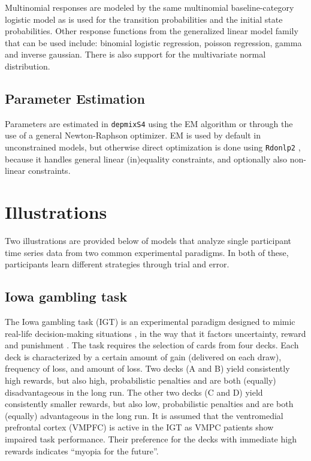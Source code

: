 \documentclass[a4paper,12pt,man,english]{apa} %
\newcommand{\pkg}{\texttt}
\begin{document}
Multinomial responses are modeled by the same multinomial 
baseline-category logistic model as is used for the transition 
probabilities and the initial state probabilities. Other response 
functions from the generalized linear model family that can be used 
include: binomial logistic regression, poisson regression, gamma and 
inverse gaussian. There is also support for the multivariate normal 
distribution. 



\subsection{Parameter Estimation}

Parameters are estimated in \pkg{depmixS4} using the EM algorithm or
through the use of a general Newton-Raphson optimizer.  EM is used by
default in unconstrained models, but otherwise direct optimization is
done using \pkg{Rdonlp2} \cite{Tamura2007,Spellucci2002}, because it
handles general linear (in)equality constraints, and optionally also
non-linear constraints.


\section{Illustrations}


Two illustrations are provided below of models that analyze single
participant time series data from two common experimental paradigms.
In both of these, participants learn different strategies through
trial and error.


\subsection{Iowa gambling task}

The Iowa gambling task (IGT) is an experimental paradigm designed to
mimic real-life decision-making situations \cite{Bechara1994}, in the
way that it factors uncertainty, reward and punishment
\cite{Dunn2006}.  The task requires the selection of cards from four
decks.  Each deck is characterized by a certain amount of gain
(delivered on each draw), frequency of loss, and amount of loss.  Two
decks (A and B) yield consistently high rewards, but also high,
probabilistic penalties and are both (equally) disadvantageous in the
long run.  The other two decks (C and D) yield consistently smaller
rewards, but also low, probabilistic penalties and are both (equally)
advantageous in the long run.  It is assumed that the ventromedial
prefrontal cortex (VMPFC) is active in the IGT as VMPC patients show
impaired task performance.  Their preference for the decks with
immediate high rewards indicates ``myopia for the future''.
\end{document}
